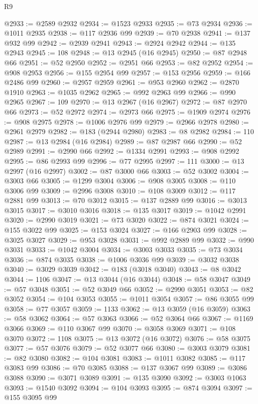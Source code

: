 \begin{lexlean}{R9}
\begin{coremodule}
@2933 := @2589 @2932
@2934 := @1523 @2933
@2935 := @73 @2934
@2936 := @1011 @2935
@2938 := @117 @2936 @99
@2939 := @70 @2938
@2941 := @137 @932 @99
@2942 := @2939 @2941
@2943 := @2924 @2942
@2944 := @135 @2943
@2945 := 108
@2948 := @13 @2945 (@16 @2945)
@2950 := @87 @2948 @66
@2951 := @52 @2950
@2952 := @2951 @66
@2953 := @82 @2952
@2954 := @908 @2953
@2956 := @155 @2954 @99
@2957 := @153 @2956
@2959 := @166 @2486 @99
@2960 := @2957 @2959
@2961 := @953 @2960
@2962 := @2870 @1910
@2963 := @1035 @2962
@2965 := @992 @2963 @99
@2966 := @990 @2965
@2967 := 109
@2970 := @13 @2967 (@16 @2967)
@2972 := @87 @2970 @66
@2973 := @52 @2972
@2974 := @2973 @66
@2975 := @1909 @2974
@2976 := @908 @2975
@2978 := @1006 @2976 @99
@2979 := @2966 @2978
@2980 := @2961 @2979
@2982 := @183 (@2944 @2980)
@2983 := @8 @2982
@2984 := 110
@2987 := @13 @2984 (@16 @2984)
@2989 := @87 @2987 @66
@2990 := @52 @2989
@2991 := @2990 @66
@2992 := @1334 @2991
@2993 := @908 @2992
@2995 := @86 @2993 @99
@2996 := @77 @2995
@2997 := 111
@3000 := @13 @2997 (@16 @2997)
@3002 := @87 @3000 @66
@3003 := @52 @3002
@3004 := @3003 @66
@3005 := @1299 @3004
@3006 := @908 @3005
@3008 := @110 @3006 @99
@3009 := @2996 @3008
@3010 := @108 @3009
@3012 := @117 @2881 @99
@3013 := @70 @3012
@3015 := @137 @2889 @99
@3016 := @3013 @3015
@3017 := @3010 @3016
@3018 := @135 @3017
@3019 := @1042 @2991
@3020 := @2990 @3019
@3021 := @73 @3020
@3022 := @874 @3021
@3024 := @155 @3022 @99
@3025 := @153 @3024
@3027 := @166 @2903 @99
@3028 := @3025 @3027
@3029 := @953 @3028
@3031 := @992 @2889 @99
@3032 := @990 @3031
@3033 := @1042 @3004
@3034 := @3003 @3033
@3035 := @73 @3034
@3036 := @874 @3035
@3038 := @1006 @3036 @99
@3039 := @3032 @3038
@3040 := @3029 @3039
@3042 := @183 (@3018 @3040)
@3043 := @8 @3042
@3044 := 1106
@3047 := @13 @3044 (@16 @3044)
@3048 := @58 @3047
@3049 := @57 @3048
@3051 := @52 @3049 @66
@3052 := @2990 @3051
@3053 := @82 @3052
@3054 := @104 @3053
@3055 := @1011 @3054
@3057 := @86 @3055 @99
@3058 := @77 @3057
@3059 := 1133
@3062 := @13 @3059 (@16 @3059)
@3063 := @58 @3062
@3064 := @57 @3063
@3066 := @52 @3064 @66
@3067 := @1169 @3066
@3069 := @110 @3067 @99
@3070 := @3058 @3069
@3071 := @108 @3070
@3072 := 1108
@3075 := @13 @3072 (@16 @3072)
@3076 := @58 @3075
@3077 := @57 @3076
@3079 := @52 @3077 @66
@3080 := @3003 @3079
@3081 := @82 @3080
@3082 := @104 @3081
@3083 := @1011 @3082
@3085 := @117 @3083 @99
@3086 := @70 @3085
@3088 := @137 @3067 @99
@3089 := @3086 @3088
@3090 := @3071 @3089
@3091 := @135 @3090
@3092 := @3003 @1063
@3093 := @1540 @3092
@3094 := @104 @3093
@3095 := @874 @3094
@3097 := @155 @3095 @99

\end{coremodule}
\end{lexlean}
